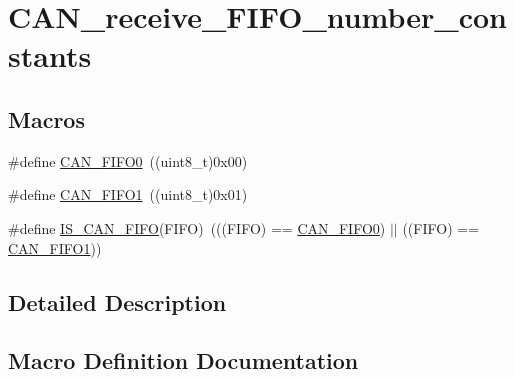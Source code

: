 \hypertarget{group___c_a_n__receive___f_i_f_o__number__constants}{}\section{C\+A\+N\+\_\+receive\+\_\+\+F\+I\+F\+O\+\_\+number\+\_\+constants}
\label{group___c_a_n__receive___f_i_f_o__number__constants}
\subsection*{Macros}
\begin{DoxyCompactItemize}
\item 
\#define \mbox{\hyperlink{group___c_a_n__receive___f_i_f_o__number__constants_ga8f52eeefb86b2af5b7c3b4b75fa4d114}{C\+A\+N\+\_\+\+F\+I\+F\+O0}}~((uint8\+\_\+t)0x00)
\item 
\#define \mbox{\hyperlink{group___c_a_n__receive___f_i_f_o__number__constants_gafbcf3f13dbf61030ab7a812595ba9850}{C\+A\+N\+\_\+\+F\+I\+F\+O1}}~((uint8\+\_\+t)0x01)
\item 
\#define \mbox{\hyperlink{group___c_a_n__receive___f_i_f_o__number__constants_gaeeb94bf58bd48b8928f964eaaa20a24a}{I\+S\+\_\+\+C\+A\+N\+\_\+\+F\+I\+FO}}(F\+I\+FO)~(((F\+I\+FO) == \mbox{\hyperlink{group___c_a_n__receive___f_i_f_o__number__constants_ga8f52eeefb86b2af5b7c3b4b75fa4d114}{C\+A\+N\+\_\+\+F\+I\+F\+O0}}) $\vert$$\vert$ ((F\+I\+FO) == \mbox{\hyperlink{group___c_a_n__receive___f_i_f_o__number__constants_gafbcf3f13dbf61030ab7a812595ba9850}{C\+A\+N\+\_\+\+F\+I\+F\+O1}}))
\end{DoxyCompactItemize}


\subsection{Detailed Description}


\subsection{Macro Definition Documentation}
\mbox{\label{group___c_a_n__receive___f_i_f_o__number__constants_ga8f52eeefb86b2af5b7c3b4b75fa4d114}} 
